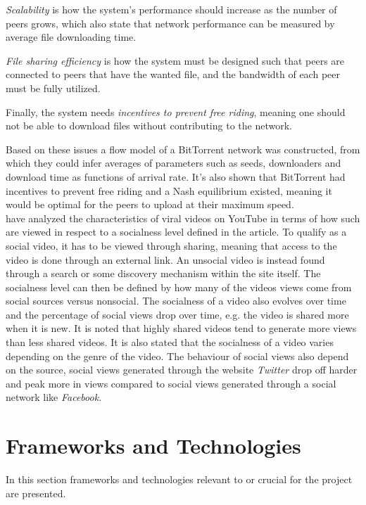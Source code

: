 \emph{Scalability} is how the system's performance should increase as the number of peers grows, which also state that network performance can be measured by average file downloading time.

\emph{File sharing efficiency} is how the system must be designed such that peers are connected to peers that have the wanted file, and the bandwidth of each peer must be fully utilized.

Finally, the system needs \emph{incentives to prevent free riding}, meaning one should not be able to download files without contributing to the network.

Based on these issues a flow model of a BitTorrent network was constructed, from which they could infer averages of parameters such as seeds, downloaders and download time as functions of arrival rate. It's also shown that BitTorrent had incentives to prevent free riding and a Nash equilibrium existed, meaning it would be optimal for the peers to upload at their maximum speed.
\\


\citet{broxton2013catching} have analyzed the characteristics of viral videos on YouTube in terms of how such are viewed in respect to a socialness level defined in the article. To qualify as a social video, it has to be viewed through sharing, meaning that access to the video is done through an external link. An unsocial video is instead found through a search or some discovery mechanism within the site itself. The socialness level can then be defined by how many of the videos views come from social sources versus nonsocial. The socialness of a video also evolves over time and the percentage of social views drop over time, e.g. the video is shared more when it is new. It is noted that highly shared videos tend to generate more views than less shared videos. It is also stated that the socialness of a video varies depending on the genre of the video. The behaviour of social views also depend on the source, social views generated through the website \textit{Twitter} drop off harder and peak more in views compared to social views generated through a social network like \textit{Facebook}.


\section{Frameworks and Technologies}
\label{sec:fram-techn}
In this section frameworks and technologies relevant to or crucial for the project are presented.


